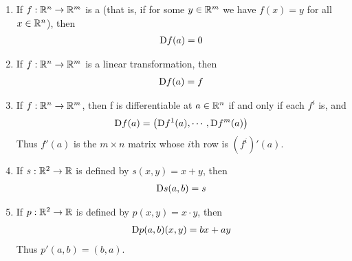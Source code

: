 \begin{theorem}
    \begin{enumerate}[label={\upshape(\arabic*)}]
        \item If $f:\mathbb{R}^n\to \mathbb{R}^m$ is a  (that is, if for some
            $y \in \mathbb{R}^m$ we have $f(x) = y$ for all $x \in \mathbb{R}^n$), then
            \begin{align*}
                \mathrm{D}f(a) = 0
            \end{align*} 
        \item If $f:\mathbb{R}^n\to \mathbb{R}^m$ is a linear transformation, then
            \begin{align*}
                \mathrm{D}f(a) = f
            \end{align*}
        \item If $f:\mathbb{R}^n\to \mathbb{R}^m$, then f is differentiable at $a\in \mathbb{R}^n$ if and only if 
            each $f^i$ is, and 
            \begin{align*}
                \mathrm{D}f(a) = \left(\mathrm{D}f^1(a), \cdots, \mathrm{D}f^m(a)\right)
            \end{align*}
            Thus $f'(a)$ is the $m\times n$ matrix whose $i$th row is $\left(f^i\right)'(a)$.
        \item If $s:\mathbb{R}^2\to \mathbb{R}$ is defined by $s(x, y) = x+y$, then 
            \begin{align*}
                \mathrm{D}s(a, b) = s
            \end{align*}
        \item If $p:\mathbb{R}^2\to \mathbb{R}$ is defined by $p(x, y) = x\cdot y$, then 
            \begin{align*}
                \mathrm{D}p(a, b)(x, y) = bx + ay
            \end{align*}
            Thus $p'(a, b) = (b, a)$.
    \end{enumerate}
\end{theorem}

